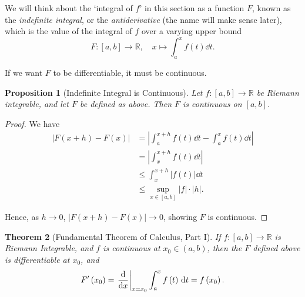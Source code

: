 \documentclass[11pt]{article}
\numberwithin{equation}{section}
\newtheorem{theorem}{Theorem}[section]
\newtheorem{proposition}[theorem]{Proposition}
\theoremstyle{definition}
\theoremstyle{remark}
\newcommand{\pqty}[1]{\left(#1\right)}
\newcommand{\abs}[1]{\left|#1\right|}
\newcommand{\ccintv}[2]{[#1,#2]}
\newcommand{\functiondomain}[3]{#1:#2\to #3}
\newcommand{\function}[5]{#1:#2\to #3,\quad #4\mapsto #5}
\newcommand{\RR}{\mathbb R}
\newcommand{\rightbar}[1]{\left.#1\right|}
\begin{document}
We will think about the `integral of \(f\)' in this section as a function \(F\), known as the \emph{indefinite integral}, or the \emph{antiderivative} (the name will make sense later), which is the value of the integral of \(f\) over a varying upper bound
\[
    \function{F}{\ccintv{a}{b}}{\RR}{x}{\int_{a}^{x} f\pqty{t} \dd{t}.}
\]

If we want \(F\) to be differentiable, it must be continuous.

\begin{proposition}[Indefinite Integral is Continuous]\label{analysis-unit-0166}
    \label{prop:indef-integral-continuous}%
    Let \(\functiondomain{f}{\ccintv{a}{b}}{\RR}\) be Riemann integrable, and let \(F\) be defined as above. Then \(F\) is continuous on \(\ccintv{a}{b}\).
\end{proposition}

\begin{proof}
    We have
    \begin{align*}
        \abs{F\pqty{x + h} - F\pqty{x}} &= \abs{\int_{a}^{x + h} f\pqty{t} \dd{t} - \int_{a}^{x} f\pqty{t} \dd{t}} \\
        &= \abs{\int_{x}^{x + h} f\pqty{t} \dd{t}} \\
        &\leq \int_{x}^{x + h} \abs{f\pqty{t}} \dd{t} \\
        &\leq \sup_{x \in \ccintv{a}{b}} \abs{f} \cdot \abs{h}.
    \end{align*}

    Hence, as \(h \to 0\), \(\abs{F\pqty{x + h} - F\pqty{x}} \to 0\), showing \(F\) is continuous.
\end{proof}

\begin{theorem}[Fundamental Theorem of Calculus, Part I]\label{analysis-unit-0167}
    \label{thm:ftc-1}%
    If \(\functiondomain{f}{\ccintv{a}{b}}{\RR}\) is Riemann Integrable, and \(f\) is continuous at \(x_0\in(a,b)\), then the \(F\) defined above is differentiable at \(x_0\), and
    \[
        F'\pqty{x_0} = \rightbar{\dv{x}}_{x = x_0} \int_{a}^{x} f\pqty{t} \dd{t} = f\pqty{x_0}.
    \]
\end{theorem}
\end{document}
